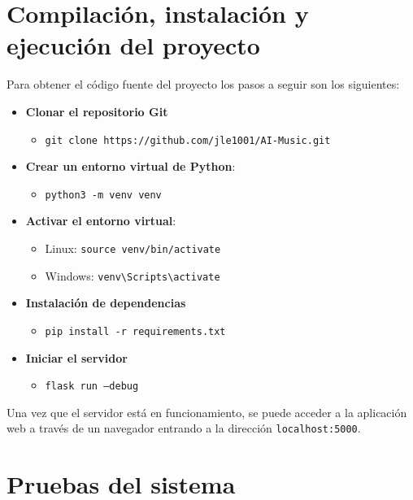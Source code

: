 \section{Compilación, instalación y ejecución del proyecto}

Para obtener el código fuente del proyecto los pasos a seguir son los siguientes:

\begin{itemize}
\tightlist

\item \textbf{Clonar el repositorio Git}
	\begin{itemize}
	\tightlist
		\item \texttt{git clone https://github.com/jle1001/AI-Music.git}
	\end{itemize}

\item \textbf{Crear un entorno virtual de Python}: 
	\begin{itemize}
	\tightlist
		\item \texttt{python3 -m venv venv}
	\end{itemize}

\item \textbf{Activar el entorno virtual}: 
	\begin{itemize}
		\item Linux: \texttt{source venv/bin/activate}
		
		\item Windows: \texttt{venv\textbackslash Scripts\textbackslash activate}
	\end{itemize}

\item \textbf{Instalación de dependencias}
	\begin{itemize}
	\tightlist
		\item \texttt{pip install -r requirements.txt}
	\end{itemize}

\item \textbf{Iniciar el servidor}
	\begin{itemize}
	\tightlist
		\item \texttt{flask run --debug}
	\end{itemize}
\end{itemize}

Una vez que el servidor está en funcionamiento, se puede acceder a la aplicación web a través de un navegador entrando a la dirección \texttt{localhost:5000}.

\section{Pruebas del sistema}

